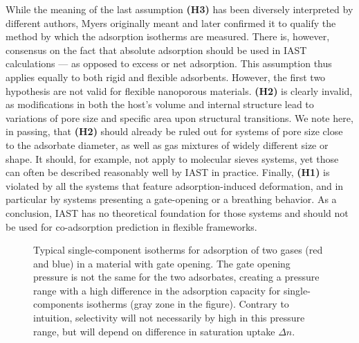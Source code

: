 \documentclass[thesis]{subfiles}
\begin{document}
While the meaning of the last assumption \textbf{(H3)} has been diversely
interpreted by different authors, Myers\cite{Myers1965} originally meant and
later confirmed\cite{Myers2014} it to qualify the method by which the adsorption
isotherms are measured. There is, however, consensus on the fact that absolute
adsorption should be used in IAST calculations --- as opposed to excess or net
adsorption.\cite{Brandani2016} This assumption thus applies equally to both
rigid and flexible adsorbents. However, the first two hypothesis are not valid
for flexible nanoporous materials. \textbf{(H2)} is clearly invalid, as
modifications in both the host's volume and internal structure lead to
variations of pore size and specific area upon structural transitions. We note
here, in passing, that \textbf{(H2)} should already be ruled out for systems of
pore size close to the adsorbate diameter, as well as gas mixtures of widely
different size or shape.  It should, for example, not apply to molecular sieves
systems, yet those can often be described reasonably well by IAST in practice.
Finally, \textbf{(H1)} is violated by all the systems that feature
adsorption-induced deformation, and in particular by systems presenting a
gate-opening or a breathing behavior. As a conclusion, IAST has no theoretical
foundation for those systems and should not be used for co-adsorption prediction
in flexible frameworks.

\begin{figure}[htp]
    \centering
    
    \caption{Typical single-component isotherms for adsorption of two gases (red
    and blue) in a material with gate opening. The gate opening pressure is not
    the same for the two adsorbates, creating a pressure range with a high
    difference in the adsorption capacity for single-components isotherms (gray
    zone in the figure). Contrary to intuition, selectivity will not necessarily
    by high in this pressure range, but will depend on difference in saturation
    uptake $\Delta n$.}
    \label{fig:open-close-selectivity}
\end{figure}
\end{document}
